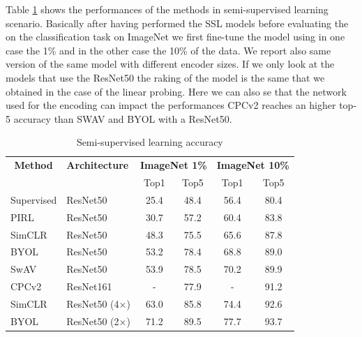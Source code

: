 Table \ref{tab:imagenet-1-perc-semisup} shows the performances of the methods in semi-supervised learning scenario. Basically after having performed the SSL models before evaluating the on the classification task on ImageNet we first fine-tune the model using in one case the 1\% and in the other case the 10\% of the data. We report also same version of the same model with different encoder sizes. If we only look at the models that use the ResNet50 the raking of the model is the same that we obtained in the case of the linear probing. Here we can also se that the network used for the encoding can impact the performances CPCv2 reaches an higher top-5 accuracy than SWAV and BYOL with a ResNet50.

\begin{table}[H]
	\centering
	\begin{tabular}{|l|l|cc|cc|}
		\hline
		\multicolumn{1}{|c|}{\textbf{Method}} & \textbf{Architecture} & \multicolumn{2}{c|}{\textbf{ImageNet 1\%}} & \multicolumn{2}{c|}{\textbf{ImageNet 10\%}} \\
		\multicolumn{1}{|c|}{} &  & Top1 & Top5 & Top1 & Top5  \\
		\hline
		Supervised & ResNet50 & 25.4 & 48.4 & 56.4 & 80.4 \\
		PIRL & ResNet50 & 30.7 & 57.2  & 60.4 & 83.8 \\
		SimCLR & ResNet50 & 48.3 & 75.5  & 65.6 & 87.8 \\
		BYOL & ResNet50  & 53.2 & 78.4  & 68.8 & 89.0 \\ 
		SwAV & ResNet50 & 53.9 & 78.5  & 70.2 & 89.9 \\
		CPCv2 & ResNet161 & - & 77.9 & - & 91.2 \\
		SimCLR & ResNet50 (4$\times$) & 63.0 & 85.8 & 74.4 & 92.6 \\
		BYOL & ResNet50 (2$\times$) & 71.2 & 89.5 & 77.7 & 93.7 \\
		\hline
	\end{tabular}
	\caption{Semi-supervised learning accuracy}
	\label{tab:imagenet-1-perc-semisup}
\end{table}

